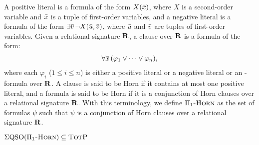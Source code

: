 \newcommand{\pP}{\textit{P}}
\newcommand{\pN}{\textit{N}}
\newcommand{\pV}{\textit{V}}
\newcommand{\pT}{\textit{T}}
\newcommand{\pA}{\textit{A}}
\newcommand{\pNC}{\textit{NC}}


A positive literal is a formula of the form $X(\bar{x})$, where $X$ is a second-order variable and $\bar{x}$ is a tuple of first-order variables, and a negative literal is a formula of the form $\exists \bar{v} \, \neg X(\bar{u},\bar{v})$, where $\bar{u}$ and $\bar{v}$ are tuples of first-order variables. Given a relational signature $\mathbf{R}$, a clause over $\mathbf{R}$ is a formula of the form:
\begin{eqnarray*}
\forall \bar{x} \, (\varphi_1 \vee \cdots \vee \varphi_n),
\end{eqnarray*}
where each $\varphi_i$ ($1 \leq i \leq n$) is either a positive literal or a negative literal or an \fo-formula over $\mathbf{R}$.  A clause is said to be Horn if it contains at most one positive literal, and a formula is said to be Horn if it is a conjunction of Horn clauses over a relational signature $\mathbf{R}$. With this terminology, we define $\Pi_1\textsc{-Horn}$ as the set of formulas $\psi$ such that $\psi$ is a conjunction of Horn clauses over a relational signature $\mathbf{R}$. 

\begin{proposition}\label{prop-uhorn-pe}
$\Sigma{\rm QSO}(\Pi_1\textsc{-Horn}) \subseteq \text{\sc TotP}$
\end{proposition}

